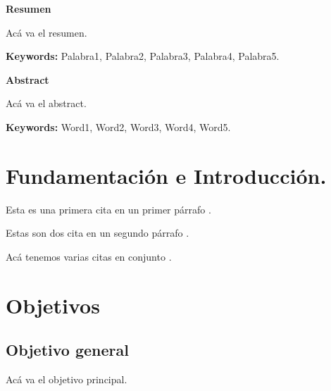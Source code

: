 

\pagestyle{fancy}
\fancyhead{}
\fancyfoot{}
\fancyfoot[R]{\thepage}

\tableofcontents %
\newpage %

\begin{flushleft} 
	\fontsize{14pt}{17pt}\selectfont
	\textbf{Resumen}
\end{flushleft}

Acá va el resumen.\par

\begin{footnotesize}
	\textbf{Keywords:} Palabra1, Palabra2, Palabra3, Palabra4, Palabra5.
\end{footnotesize}

\begin{flushleft} 
	\fontsize{14pt}{17pt}\selectfont
	\textbf{Abstract}
\end{flushleft}

Acá va el  abstract.\par

\begin{footnotesize}
	\textbf{Keywords:} Word1, Word2, Word3, Word4, Word5.
\end{footnotesize}


\newpage


\section{Fundamentación e Introducción.}
Esta es una primera cita en un primer párrafo \cite{Repp2005}.\par
Estas son dos cita en un segundo párrafo \cite{Grootswager2020, Geronazzo2014}.\par
Acá tenemos varias citas en conjunto \cite{Gallant2019, Bridges2020, Anwyl2020, Pronk2020}.

\section{Objetivos}
\subsection{Objetivo general}
Acá va el objetivo principal.\par
